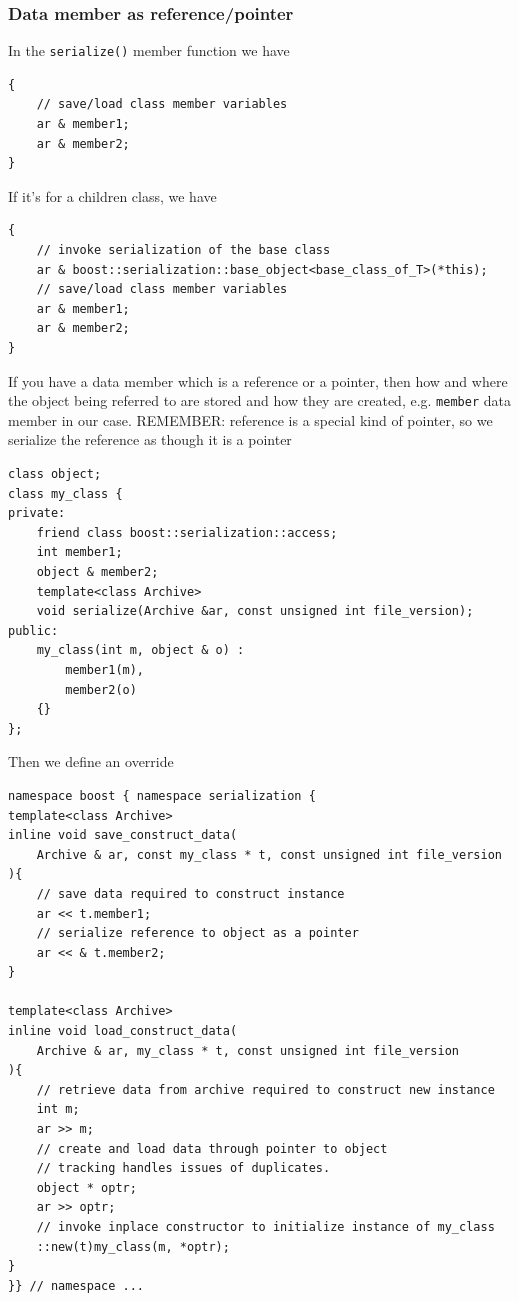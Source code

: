 \subsubsection{Data member as reference/pointer}

In the \verb!serialize()! member function we have
\begin{verbatim}
{
    // save/load class member variables
    ar & member1;
    ar & member2;
}
\end{verbatim}

If it's for a children class, we have
\begin{verbatim}
{
    // invoke serialization of the base class 
    ar & boost::serialization::base_object<base_class_of_T>(*this);
    // save/load class member variables
    ar & member1;
    ar & member2;
}
\end{verbatim}

If you have a data member which is a reference or a pointer, then how and where
the object being referred to are stored and how they are created, e.g.
\verb!member! data member in our case. REMEMBER: reference is a special kind of
pointer, so we serialize the reference as though it is a pointer 
\begin{verbatim}
class object;
class my_class {
private:
    friend class boost::serialization::access;
    int member1;
    object & member2;
    template<class Archive>
    void serialize(Archive &ar, const unsigned int file_version);
public:
    my_class(int m, object & o) :
        member1(m), 
        member2(o)
    {}
};
\end{verbatim}

Then we define an override
\begin{verbatim}
namespace boost { namespace serialization {
template<class Archive>
inline void save_construct_data(
    Archive & ar, const my_class * t, const unsigned int file_version
){
    // save data required to construct instance
    ar << t.member1;
    // serialize reference to object as a pointer
    ar << & t.member2;
}

template<class Archive>
inline void load_construct_data(
    Archive & ar, my_class * t, const unsigned int file_version
){
    // retrieve data from archive required to construct new instance
    int m;
    ar >> m;
    // create and load data through pointer to object
    // tracking handles issues of duplicates.
    object * optr;
    ar >> optr;
    // invoke inplace constructor to initialize instance of my_class
    ::new(t)my_class(m, *optr);
}
}} // namespace ...
\end{verbatim}


